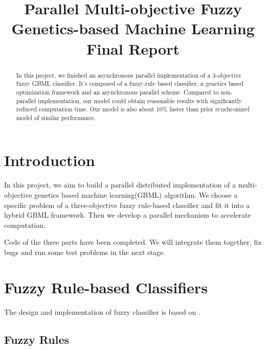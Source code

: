 \documentclass[conference]{IEEEtran}
\begin{document}
  
  \title{Parallel Multi-objective Fuzzy Genetics-based Machine Learning \\ Final Report}
  
  \author{
  }
  
  \maketitle
  
  \begin{abstract}
  In this project, we finished an asynchronous parallel implementation of a 3-objective fuzzy GBML classifier. It's composed of a fuzzy-rule based classifier, a genetics based optimization framework and an asynchronous parallel scheme. Compared to non-parallel implementation, our model could obtain reasonable results with significantly reduced computation time. Our model is also about 10\% faster than prior synchronized model of similar performance.
  \end{abstract}
  \IEEEpeerreviewmaketitle
  
  \section{Introduction}
  In this project, we aim to build a parallel distributed implementation of a multi-objective genetics based machine learning(GBML) algorithm. We choose a specific problem of a three-objective fuzzy rule-based classifier and fit it into a hybrid GBML framework. Then we develop a parallel mechanism to accelerate computation.

  Code of the three parts have been completed. We will integrate them together, fix bugs and run some test problems in the next stage.

  \section{Fuzzy Rule-based Classifiers}
  The design and implementation of fuzzy classifier is based on \cite{ishibuchi2007analysis}.
  \subsection{Fuzzy Rules}
\end{document}
